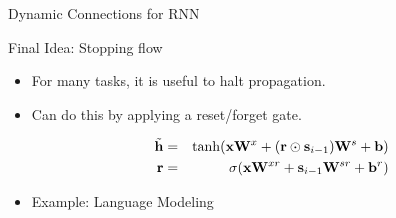 \documentclass{beamer}
\begin{document}
\begin{frame}{Dynamic Connections for RNN}
  \begin{center}
  \end{center}
\end{frame}

\begin{frame}{Final Idea: Stopping flow}
  \begin{itemize}
  \item For many tasks, it is useful to halt propagation.
    \air
  \item Can do this by applying a reset/forget gate. 
    \air 

    \begin{eqnarray*}
      \tilde{\mathbf{h}} &=& \tanh(\mathbf{x} \mathbf{W}^x + (\mathbf{r} \odot \mathbf{s}_{i-1})  \mathbf{W}^s + \mathbf{b})  \\
      \mathbf{r} &=& \sigma(\mathbf{x} \mathbf{W}^{xr} + \mathbf{s}_{i-1}\mathbf{W}^{sr} + \mathbf{b}^r) \\
    \end{eqnarray*}
  \item Example: Language Modeling
    
  \end{itemize}
\end{frame}
\end{document}
